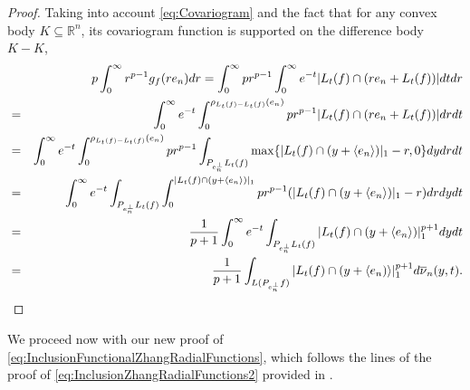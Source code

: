 \documentclass{amsart}
\newcommand{\R}{\mathbb R}
\theoremstyle{remark}
\theoremstyle{definition}
\numberwithin{equation}{section}
\begin{document}
\begin{proof}
Taking into account \eqref{eq:Covariogram} and the fact that for any convex body $K\subseteq\R^n$, its covariogram function is supported on the difference body $K-K$,
\begin{eqnarray*}
&&p\int_0^{\infty} r^{p-1} g_f(re_n) dr=\int_0^{\infty} p r^{p-1} \int_0^{\infty} e^{-t} |L_t(f) \cap (re_n+L_t(f)) | dt dr \cr
&=& \int_0^{\infty} e^{-t} \int_0^{\rho_{L_t(f)-L_t(f)}(e_n)} p r^{p-1}  |L_t(f) \cap (re_n+L_t(f)) | dr dt \cr
&=& \int_0^{\infty} e^{-t} \int_0^{\rho_{L_t(f)-L_t(f)}(e_n)} p r^{p-1}  \int_{P_{e_n^{\perp}}L_t(f)} \max \{|L_t(f) \cap (y+\langle e_n \rangle) |_1 - r , 0  \} dy dr dt \cr
&=&  \int_0^{\infty} e^{-t} \int_{P_{e_n^{\perp}}L_t(f)} \int_0^{ |L_t(f) \cap (y+\langle e_n \rangle) |_1  } p r^{p-1}  ( |L_t(f) \cap (y+\langle e_n \rangle) |_1 - r ) dr dy dt \cr
&=&\frac{1}{p+1}\int_0^{\infty} e^{-t} \int_{P_{e_n^{\perp}}L_t(f)}  |L_t(f) \cap (y+\langle e_n \rangle) |_1^{p+1} dy dt\cr
&=&\frac{1}{p+1}\int_{L(P_{e_n^\perp}f)}|L_t(f)\cap(y+\langle e_n)\rangle|_1^{p+1}d\overline{\nu}_{n}(y,t).
\end{eqnarray*}
\end{proof}

We proceed now with our new proof of \eqref{eq:InclusionFunctionalZhangRadialFunctions}, which follows the lines of the proof of \eqref{eq:InclusionZhangRadialFunctions2} provided in \cite{ALM}.
\end{document}
